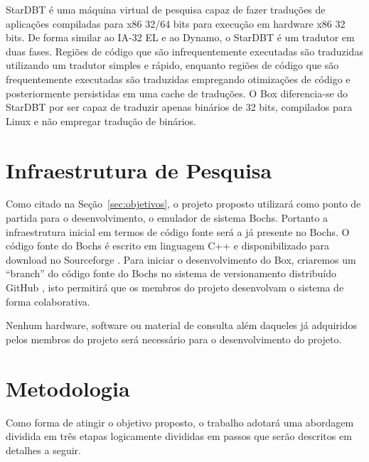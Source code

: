 \documentclass[11pt,twoside]{article}
\begin{document}
StarDBT \cite{Wang2007} é uma máquina virtual de pesquisa capaz de fazer traduções de 
aplicações compiladas para x86 32/64 bits para execução em hardware x86 32 bits. De 
forma similar ao IA-32 EL e ao Dynamo, o StarDBT é um tradutor em duas fases. Regiões 
de código que são infrequentemente executadas são traduzidas utilizando um tradutor 
simples e rápido, enquanto regiões de código que são frequentemente executadas são 
traduzidas empregando otimizações de código e posteriormente persistidas em uma cache 
de traduções. O Box diferencia-se do StarDBT por ser capaz de traduzir apenas binários 
de 32 bits, compilados para Linux e não empregar tradução de binários.





\section{Infraestrutura de Pesquisa} \label{sec:infraestrutura}

Como citado na Seção~\ref{sec:objetivos}, o projeto proposto utilizará como
ponto de partida para o desenvolvimento, o emulador de sistema Bochs. Portanto 
a infraestrutura inicial em termos de código fonte será a já presente no Bochs. 
O código fonte do Bochs é escrito em linguagem C++ e disponibilizado para download
no Sourceforge \cite{bochs_site}. Para iniciar o desenvolvimento do Box, criaremos
um ``branch'' do código fonte do Bochs no sistema de versionamento distribuído
GitHub \cite{github}, isto permitirá que os membros do projeto desenvolvam o sistema
de forma colaborativa.

Nenhum hardware, software ou material de consulta além daqueles já adquiridos 
pelos membros do projeto será necessário para o desenvolvimento do projeto.





\section{Metodologia}  \label{sec:metodologia}

Como forma de atingir o objetivo proposto, o trabalho adotará uma abordagem dividida em três etapas logicamente divididas em passos que serão descritos em detalhes a seguir.
\end{document}
